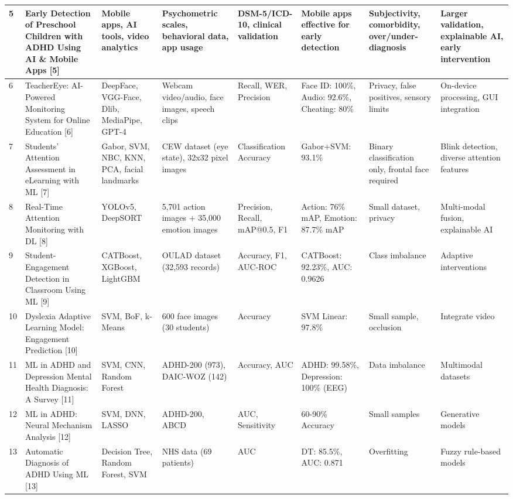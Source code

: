 \documentclass[12pt]{article}
\begin{document}
\begin{longtable}{|p{}|p{}|p{}|p{}|p{}|p{}|p{}|p{}|}
\hline
5 & Early Detection of Preschool Children with ADHD Using AI \& Mobile Apps [5] & Mobile apps, AI tools, video analytics & Psychometric scales, behavioral data, app usage & DSM-5/ICD-10, clinical validation & Mobile apps effective for early detection & Subjectivity, comorbidity, over/under-diagnosis & Larger validation, explainable AI, early intervention \\
\hline
6 & TeacherEye: AI-Powered Monitoring System for Online Education [6] & DeepFace, VGG-Face, Dlib, MediaPipe, GPT-4 & Webcam video/audio, face images, speech clips & Recall, WER, Precision & Face ID: 100\%, Audio: 92.6\%, Cheating: 80\% & Privacy, false positives, sensory limits & On-device processing, GUI integration \\
\hline
7 & Students’ Attention Assessment in eLearning with ML [7] & Gabor, SVM, NBC, KNN, PCA, facial landmarks & CEW dataset (eye state), 32x32 pixel images & Classification Accuracy & Gabor+SVM: 93.1\% & Binary classification only, frontal face required & Blink detection, diverse attention features \\
\hline
8 & Real-Time Attention Monitoring with DL [8] & YOLOv5, DeepSORT & 5,701 action images + 35,000 emotion images & Precision, Recall, mAP@0.5, F1 & Action: 76\% mAP, Emotion: 87.7\% mAP & Small dataset, privacy & Multi-modal fusion, explainable AI \\
\hline
9 & Student-Engagement Detection in Classroom Using ML [9] & CATBoost, XGBoost, LightGBM & OULAD dataset (32,593 records) & Accuracy, F1, AUC-ROC & CATBoost: 92.23\%, AUC: 0.9626 & Class imbalance & Adaptive interventions \\
\hline
10 & Dyslexia Adaptive Learning Model: Engagement Prediction [10] & SVM, BoF, k-Means & 600 face images (30 students) & Accuracy & SVM Linear: 97.8\% & Small sample, occlusion & Integrate video \\
\hline
11 & ML in ADHD and Depression Mental Health Diagnosis: A Survey [11] & SVM, CNN, Random Forest & ADHD-200 (973), DAIC-WOZ (142) & Accuracy, AUC & ADHD: 99.58\%, Depression: 100\% (EEG) & Data imbalance & Multimodal datasets \\
\hline
12 & ML in ADHD: Neural Mechanism Analysis [12] & SVM, DNN, LASSO & ADHD-200, ABCD & AUC, Sensitivity & 60-90\% Accuracy & Small samples & Generative models \\
\hline
13 & Automatic Diagnosis of ADHD Using ML [13] & Decision Tree, Random Forest, SVM & NHS data (69 patients) & AUC & DT: 85.5\%, AUC: 0.871 & Overfitting & Fuzzy rule-based models \\

\end{longtable}
\end{document}
